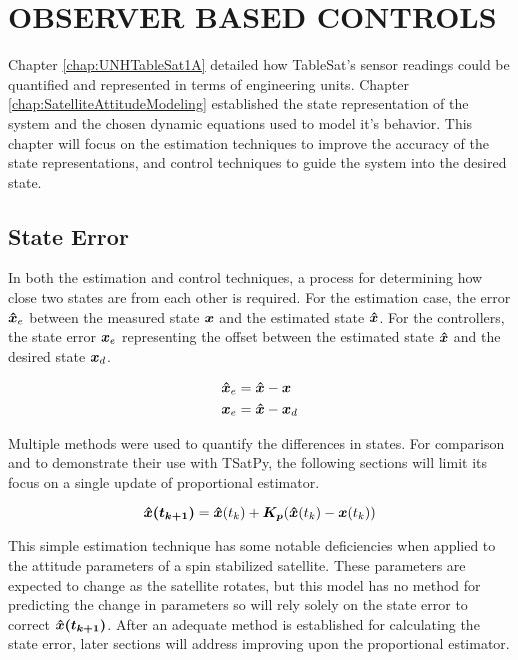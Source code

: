 
\chapter{OBSERVER BASED CONTROLS}
\label{chap:ObserverBasedControls}

Chapter \ref{chap:UNHTableSat1A} detailed how TableSat's sensor readings could be quantified and represented in terms of engineering units.  Chapter \ref{chap:SatelliteAttitudeModeling} established the state representation of the system and the chosen dynamic equations used to model it's behavior.  This chapter will focus on the estimation techniques to improve the accuracy of the state representations, and control techniques to guide the system into the desired state.

\section{State Error}
\label{sec:StateError}

In both the estimation and control techniques, a process for determining how close two states are from each other is required.  For the estimation case,  the error $\boldsymbol{\hat{x}}_e$ between the measured state $\boldsymbol{x}$ and the estimated state $\boldsymbol{\hat{x}}$.  For the controllers, the state error $\boldsymbol{x}_e$ representing the offset between the estimated state $\boldsymbol{\hat{x}}$ and the desired state $\boldsymbol{x}_d$.

\begin{subequations}
  \begin{align}
    \boldsymbol{\hat{x}}_e &= \boldsymbol{\hat{x}} - \boldsymbol{x} \\
    \boldsymbol{x}_e &= \boldsymbol{\hat{x}} - \boldsymbol{x}_d
  \end{align}
  \label{eqn:StateError}
\end{subequations}

Multiple methods were used to quantify the differences in states.  For comparison and to demonstrate their use with TSatPy, the following sections will limit its focus on a single update of proportional estimator.

\begin{equation}
  \boldsymbol{\hat{x}(t_{k+1})} = \boldsymbol{\hat{x}}(t_{k}) + \boldsymbol{K_p} ( \boldsymbol{\hat{x}}(t_{k}) - \boldsymbol{x}(t_{k}) )
  \label{eqn:PEstimatorStateDiff}
\end{equation}

This simple estimation technique has some notable deficiencies when applied to the attitude parameters of a spin stabilized satellite.  These parameters are expected to change as the satellite rotates, but this model has no method for predicting the change in parameters so will rely solely on the state error to correct $\boldsymbol{\hat{x}(t_{k+1})}$.  After an adequate method is established for calculating the state error, later sections will address improving upon the proportional estimator.


